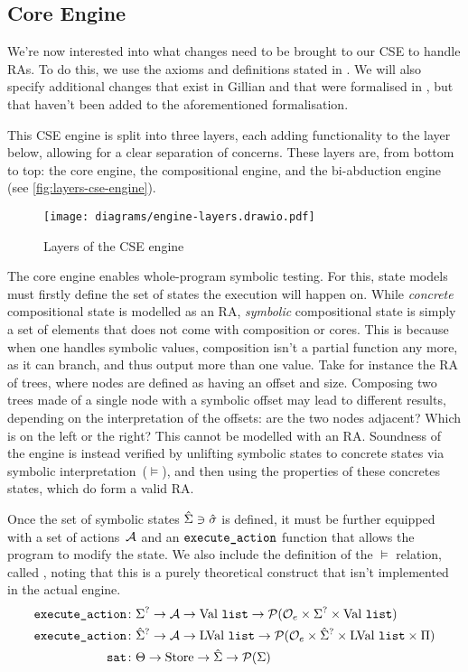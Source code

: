 \subsection{Core Engine}

We're now interested into what changes need to be brought to our CSE to handle RAs. To do this, we use the axioms and definitions stated in \cite{cse2}. We will also specify additional changes that exist in Gillian and that were formalised in \cite{sacha-phd}, but that haven't been added to the aforementioned formalisation.

This CSE engine is split into three layers, each adding functionality to the layer below, allowing for a clear separation of concerns. These layers are, from bottom to top: the core engine, the compositional engine, and the bi-abduction engine (see \autoref{fig:layers-cse-engine}).

\begin{figure}
	\centering
	\texttt{[image: diagrams/engine-layers.drawio.pdf]}
	\caption{Layers of the CSE engine}
	\label{fig:layers-cse-engine}
\end{figure}

The core engine enables whole-program symbolic testing. For this, state models must firstly define the set of states the execution will happen on. While \emph{concrete} compositional state is modelled as an RA, \emph{symbolic} compositional state is simply a set of elements that does not come with composition or cores. This is because when one handles symbolic values, composition isn't a partial function any more, as it can branch, and thus output more than one value. Take for instance the RA of trees, where nodes are defined as having an offset and size. Composing two trees made of a single node with a symbolic offset may lead to different results, depending on the interpretation of the offsets: are the two nodes adjacent? Which is on the left or the right? This cannot be modelled with an RA. Soundness of the engine is instead verified by unlifting symbolic states to concrete states via symbolic interpretation~($\models$), and then using the properties of these concretes states, which do form a valid RA.

Once the set of symbolic states $\hat{\Sigma}\ni\hat{\sigma}$ is defined, it must be further equipped with a set of actions~${\cal{A}}$ and an $\texttt{execute\_action}$ function that allows the program to modify the state. We also include the definition of the $\models$ relation, called , noting that this is a purely theoretical construct that isn't implemented in the actual engine.
\begin{align*}
	\texttt{execute\_action} &\colon \Sigma^? \rightarrow {\ensuremath{\cal{A}}} \rightarrow \text{Val}~\texttt{list} \rightarrow {\cal P}({\cal O}_e \times \Sigma^? \times \text{Val}~\texttt{list})\\
	\texttt{execute\_action} &\colon \hat{\Sigma}^? \rightarrow {\ensuremath{\cal{A}}} \rightarrow \text{LVal}~\texttt{list} \rightarrow {\cal P}({\cal O}_e \times \hat{\Sigma}^? \times \text{LVal}~\texttt{list} \times \Pi) \\
	\texttt{sat} &\colon \Theta \rightarrow \text{Store} \rightarrow \hat{\Sigma} \rightarrow {\cal P}(\Sigma)
\end{align*}

